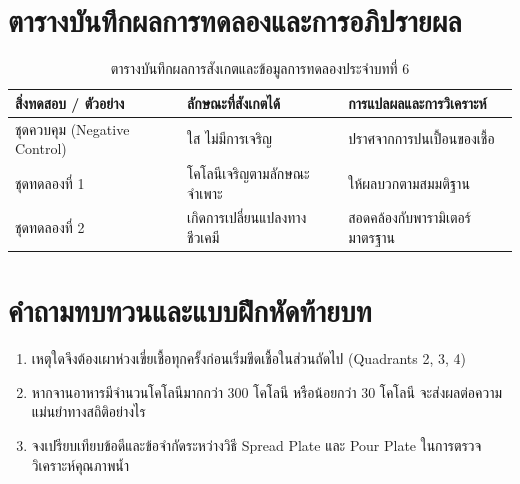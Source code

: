 \section{ตารางบันทึกผลการทดลองและการอภิปรายผล}
\begin{table}[H]
\centering\small
\caption{ตารางบันทึกผลการสังเกตและข้อมูลการทดลองประจำบทที่ 6}
\label{tab:ch06_datasheet}
\begin{tabularx}{\textwidth}{p{} p{} X}
\toprule
\textbf{สิ่งทดสอบ / ตัวอย่าง} & \textbf{ลักษณะที่สังเกตได้} & \textbf{การแปลผลและการวิเคราะห์} \\
\midrule
ชุดควบคุม (Negative Control) & ใส ไม่มีการเจริญ & ปราศจากการปนเปื้อนของเชื้อ \\
ชุดทดลองที่ 1 & โคโลนีเจริญตามลักษณะจำเพาะ & ให้ผลบวกตามสมมติฐาน \\
ชุดทดลองที่ 2 & เกิดการเปลี่ยนแปลงทางชีวเคมี & สอดคล้องกับพารามิเตอร์มาตรฐาน \\
\bottomrule
\end{tabularx}
\end{table}

\section{คำถามทบทวนและแบบฝึกหัดท้ายบท}
\begin{enumerate}
    \item เหตุใดจึงต้องเผาห่วงเขี่ยเชื้อทุกครั้งก่อนเริ่มขีดเชื้อในส่วนถัดไป (Quadrants 2, 3, 4)
    \item หากจานอาหารมีจำนวนโคโลนีมากกว่า 300 โคโลนี หรือน้อยกว่า 30 โคโลนี จะส่งผลต่อความแม่นยำทางสถิติอย่างไร
    \item จงเปรียบเทียบข้อดีและข้อจำกัดระหว่างวิธี Spread Plate และ Pour Plate ในการตรวจวิเคราะห์คุณภาพน้ำ
\end{enumerate}
